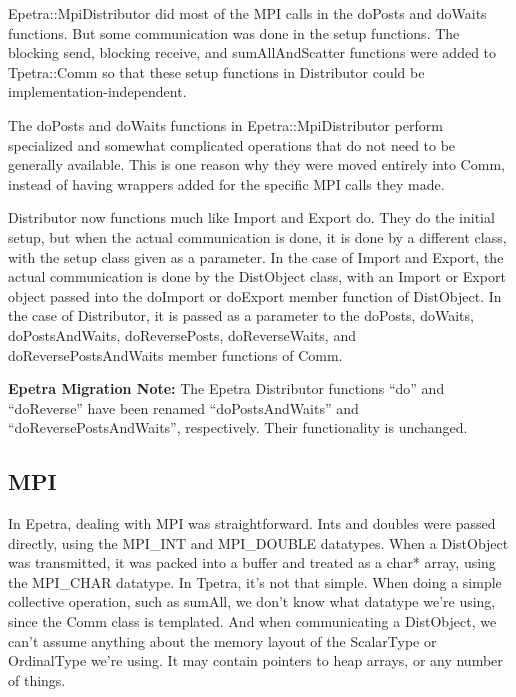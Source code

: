 \documentclass[10pt,relax]{TpetraDesign}
\begin{document}
Epetra::MpiDistributor did most of the MPI calls in the doPosts and doWaits functions. But some communication was done in the setup functions. The blocking send, blocking receive, and sumAllAndScatter functions were added to Tpetra::Comm so that these setup functions in Distributor could be implementation-independent. 

The doPosts and doWaits functions in Epetra::MpiDistributor perform specialized and somewhat complicated operations that do not need to be generally available. This is one reason why they were moved entirely into Comm, instead of having wrappers added for the specific MPI calls they made. 

Distributor now functions much like Import and Export do. They do the initial setup, but when the actual communication is done, it is done by a different class, with the setup class given as a parameter. In the case of Import and Export, the actual communication is done by the DistObject class, with an Import or Export object passed into the doImport or doExport member function of DistObject. In the case of Distributor, it is passed as a parameter to the doPosts, doWaits, doPostsAndWaits, doReversePosts, doReverseWaits, and doReversePostsAndWaits member functions of Comm.

\textbf{Epetra Migration Note:} The Epetra Distributor functions ``do'' and ``doReverse'' have been renamed ``doPostsAndWaits'' and ``doReversePostsAndWaits'', respectively. Their functionality is unchanged.

\subsection{MPI}
In Epetra, dealing with MPI was straightforward. Ints and doubles were passed directly, using the MPI\_INT and MPI\_DOUBLE datatypes. When a DistObject was transmitted, it was packed into a buffer and treated as a char* array, using the MPI\_CHAR datatype. In Tpetra, it's not that simple. When doing a simple collective operation, such as sumAll, we don't know what datatype we're using, since the Comm class is templated. And when communicating a DistObject, we can't assume anything about the memory layout of the ScalarType or OrdinalType we're using. It may contain pointers to heap arrays, or any number of things.
\end{document}
